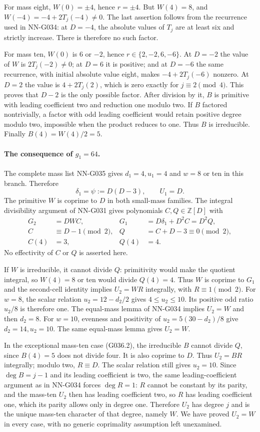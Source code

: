 For mass eight, $W(0)=\pm4$, hence $r=\pm4$.
But $W(4)=8$, and $W(-4)=-4+2T_j(-4)\ne0$.
The last assertion follows from the recurrence
used in NN-G034: at $D=-4$, the absolute values
of $T_j$ are at least six and strictly increase.
There is therefore no such factor.

For mass ten, $W(0)$ is $6$ or $-2$, hence
$r\in\{2,-2,6,-6\}$.
At $D=-2$ the value of $W$ is $2T_j(-2)\ne0$;
at $D=6$ it is positive; and at $D=-6$ the
same recurrence, with initial absolute value eight,
makes $-4+2T_j(-6)$ nonzero.
At $D=2$ the value is $4+2T_j(2)$, which is
zero exactly for $j\equiv2\pmod4$.
This proves that $D-2$ is the only possible factor.
After division by it, $B$ is primitive with leading
coefficient two and reduction one modulo two.
If $B$ factored nontrivially, a factor with odd
leading coefficient would retain positive degree
modulo two, impossible when the product reduces
to one. Thus $B$ is irreducible.
Finally $B(4)=W(4)/2=5$.

\paragraph{The consequence of $g_1=64$.}
The complete mass list NN-G035 gives
$d_1=4,u_1=4$ and $w=8$ or ten in this branch.
Therefore
\[
                 \delta_1=\psi:=D(D-3),\qquad U_1=D.
\]
The primitive $W$ is coprime to $D$ in both small-mass
families. The integral divisibility argument of
NN-G031 gives polynomials $C,Q\in\mathbb Z[D]$ with
\[
 \begin{aligned}
 G_2&=DWC,&G_1&=D\delta_1+D^2C=D^2Q,\\
 C&\equiv D-1\pmod2,&Q&=C+D-3\equiv0\pmod2,\\
 C(4)&=3,&Q(4)&=4.
 \end{aligned}                                                       \tag{G036.3}
\]
No effectivity of $C$ or $Q$ is asserted here.

If $W$ is irreducible, it cannot divide $Q$:
primitivity would make the quotient integral,
so $W(4)=8$ or ten would divide $Q(4)=4$.
Thus $W$ is coprime to $G_1$ and the second-cell
identity implies $U_2=WR$ integrally, with
$R\equiv1\pmod2$.
For $w=8$, the scalar relation
$u_2=12-d_2/2$ gives $4\le u_2\le10$.
Its positive odd ratio $u_2/8$ is therefore one.
The equal-mass lemma of NN-G034 implies $U_2=W$
and then $d_2=8$.
For $w=10$, evenness and positivity of
$u_2=5(30-d_2)/8$ give $d_2=14,u_2=10$.
The same equal-mass lemma gives $U_2=W$.

In the exceptional mass-ten case (G036.2), the
irreducible $B$ cannot divide $Q$, since $B(4)=5$
does not divide four. It is also coprime to $D$.
Thus $U_2=BR$ integrally; modulo two, $R\equiv D$.
The scalar relation still gives $u_2=10$.
Since $\deg B=j-1$ and its leading coefficient is
two, the same leading-coefficient argument as in
NN-G034 forces $\deg R=1$: $R$ cannot be constant
by its parity, and the mass-ten $U_2$ then has
leading coefficient two, so $R$ has leading
coefficient one, which its parity allows only
in degree one.
Therefore $U_2$ has degree $j$ and is the unique
mass-ten character of that degree, namely $W$.
We have proved $U_2=W$ in every case, with no
generic coprimality assumption left unexamined.

